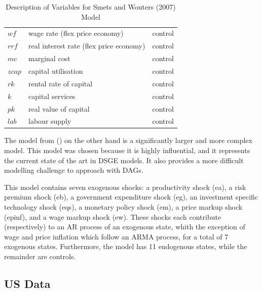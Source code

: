 \documentclass{article}
\begin{document}
\begin{table}
\begin{tabular}{|l|l|l|}
    $wf$ & wage rate (flex price economy) & control \\
    $rrf$ & real interest rate (flex price economy) & control \\
    $mc$ & marginal cost & control \\
    $zcap$ & capital utilisation & control \\
    $rk$ & rental rate of capital & control \\
    $k$ & capital services & control \\
    $pk$ & real value of capital & control \\
    $lab$ & labour supply & control \\ \cline{2-2}
    \hline
  \end{tabular}
  \caption{Description of Variables for Smets and Wouters (2007) Model}
  \label{tab2}
\end{table}

The model from \citeauthor{smets2007shocks} (\citeyear{smets2007shocks}) on the other hand is a significantly larger and more complex model. This model was chosen because it is highly influential, and it represents the current state of the art in DSGE models. It also provides a more difficult modelling challenge to approach with DAGs. 

This model contains seven exogenous shocks: a productivity shock (ea), a risk premium shock (eb), a government expenditure shock (eg), an investment specific technology shock (eqs), a monetary policy shock (em), a price markup shock (epinf), and a wage markup shock (ew). These shocks each contribute (respectively) to an AR process of an exogenous state, whith the exception of wage and price inflation which follow an ARMA process, for a total of 7 exogenous states. Furthermore, the model has 11 endogenous states, while the remainder are controls.

\subsection{US Data}
\end{document}
